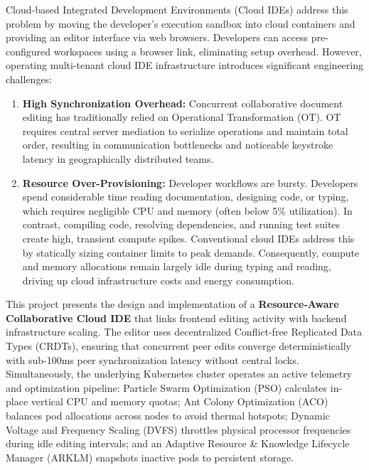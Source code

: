 \documentclass[12pt,a4paper]{report}
\begin{document}
Cloud-based Integrated Development Environments (Cloud IDEs) address this problem by moving the developer's execution sandbox into cloud containers and providing an editor interface via web browsers. Developers can access pre-configured workspaces using a browser link, eliminating setup overhead. However, operating multi-tenant cloud IDE infrastructure introduces significant engineering challenges:
\begin{enumerate}
    \item \textbf{High Synchronization Overhead:} Concurrent collaborative document editing has traditionally relied on Operational Transformation (OT). OT requires central server mediation to serialize operations and maintain total order, resulting in communication bottlenecks and noticeable keystroke latency in geographically distributed teams.
    \item \textbf{Resource Over-Provisioning:} Developer workflows are bursty. Developers spend considerable time reading documentation, designing code, or typing, which requires negligible CPU and memory (often below 5\% utilization). In contrast, compiling code, resolving dependencies, and running test suites create high, transient compute spikes. Conventional cloud IDEs address this by statically sizing container limits to peak demands. Consequently, compute and memory allocations remain largely idle during typing and reading, driving up cloud infrastructure costs and energy consumption.
\end{enumerate}

This project presents the design and implementation of a \textbf{Resource-Aware Collaborative Cloud IDE} that links frontend editing activity with backend infrastructure scaling. The editor uses decentralized Conflict-free Replicated Data Types (CRDTs), ensuring that concurrent peer edits converge deterministically with sub-100ms peer synchronization latency without central locks. Simultaneously, the underlying Kubernetes cluster operates an active telemetry and optimization pipeline: Particle Swarm Optimization (PSO) calculates in-place vertical CPU and memory quotas; Ant Colony Optimization (ACO) balances pod allocations across nodes to avoid thermal hotspots; Dynamic Voltage and Frequency Scaling (DVFS) throttles physical processor frequencies during idle editing intervals; and an Adaptive Resource \& Knowledge Lifecycle Manager (ARKLM) snapshots inactive pods to persistent storage.
\end{document}
